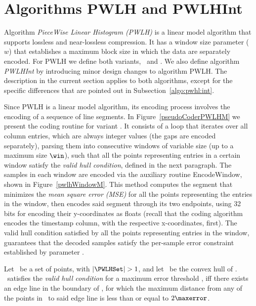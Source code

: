 

\section{Algorithms PWLH and PWLHInt}
\label{algo:pwlh}
\newcommand{\EncodeWindow}{EncodeWindow}


Algorithm \textit{PieceWise Linear Histogram (PWLH)} \cite{coder:pwlh} is a linear model algorithm that supports lossless and near-lossless compression. It has a window size parameter ($w$) that establishes a maximum block size in which the data are separately encoded. For PWLH we define both variants, \maskalgo\ and \NOmaskalgo. We also define algorithm \textit{PWLHInt} by introducing minor design changes to algorithm PWLH. The description in the current section applies to both algorithms, except for the specific differences that are pointed out in Subsection~\ref{algo:pwhl:int}.


Since PWLH is a linear model algorithm, its encoding process involves the encoding of a sequence of line segments. In Figure~\ref{pseudoCoderPWLHM} we present the coding routine for variant \maskalgo. It consists of a loop that iterates over all column entries, which are always integer values (the gaps are encoded separately), parsing them into consecutive windows of variable size (up to a maximum size $\win$), such that all the points representing entries in a certain window satisfy the \textit{valid hull condition}, defined in the next paragraph. The samples in each window are encoded via the auxiliary routine \EncodeWindow, shown in Figure~\ref{pwlhWindowM}. This method computes the segment that minimizes the \textit{mean square error (MSE)} for all the points representing the entries in the window, then encodes said segment through its two endpoints, using 32 bits for encoding their y-coordinates as floats (recall that the coding algorithm encodes the timestamp column, with the respective x-coordinates, first). The valid hull condition satisfied by all the points representing entries in the window, guarantees that the decoded samples satisfy the per-sample error constraint established by parameter \maxerror.

\clearpage








\vspace{+5pt}
\begin{defcion}
\label{def:validHull}
Let \PWLHSet\ be a set of points, with $|\PWLHSet|>1$, and let \hull\ be the convex hull of \PWLHSet. \hull\ satisfies the \textit{valid hull condition} for a maximum error threshold \maxerror, iff there exists an edge line in the boundary of \hull, for which the maximum distance from any of the points in \hull\ to said edge line is less than or equal to $2\maxerror$.
\end{defcion}



